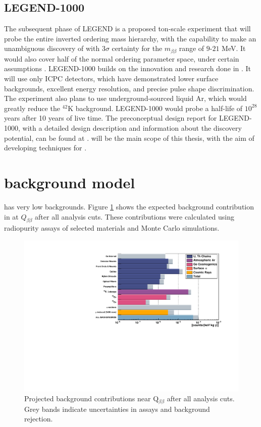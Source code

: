 \subsection{LEGEND-1000}
The subsequent phase of LEGEND is a proposed ton-scale experiment that will probe the entire inverted ordering mass hierarchy, with the capability to make an unambiguous discovery of {\onbb} with $3\sigma$ certainty for the $m_{\beta\beta}$ range of $9$-$21$ MeV. It would also cover half of the normal ordering parameter space, under certain assumptions \cite{l1000_pcdr}. LEGEND-1000 builds on the innovation and research done in {\Ltwo}. It will use only ICPC detectors, which have demonstrated lower surface backgrounds, excellent energy resolution, and precise pulse shape discrimination. The experiment also plans to use underground-sourced liquid Ar, which would greatly reduce the $^{42}$K background. LEGEND-1000 would probe a half-life of $10^{28}$ years after 10 years of live time. The preconceptual design report for LEGEND-1000, with a detailed design description and information about the discovery potential, can be found at \cite{l1000_pcdr}. {\Ltwo} will be the main scope of this thesis, with the aim of developing techniques for {\Lthou}.




\section{{\Ltwo} background model}
{\Ltwo} has very low backgrounds. Figure \ref{fig:L200_background} shows the expected background contribution in {\Ltwo} at $Q_{\beta \beta}$ after all analysis cuts. These contributions were calculated using radiopurity assays of selected materials and Monte Carlo simulations. 

\begin{figure}[!htb]
\centering
  \includegraphics[width=0.99\linewidth]{ch2/figs/L200_background.pdf}
  \caption{{\Ltwo} Projected background contributions near Q$_{\beta\beta}$ after all analysis cuts. Grey bands indicate uncertainties in assays and background rejection.}
\label{fig:L200_background}
  \end{figure}

